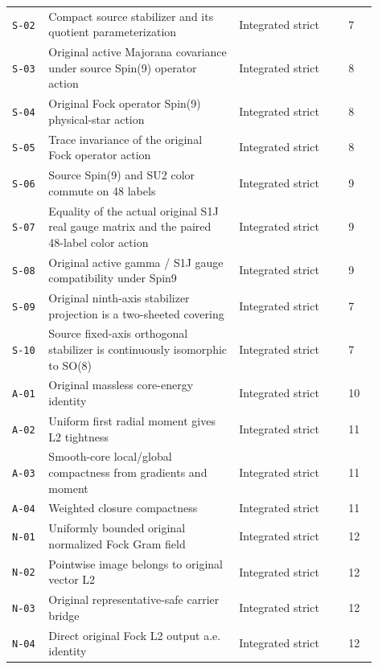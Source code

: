 \begin{longtable}{@{}p{0.09\linewidth}p{0.47\linewidth}p{0.27\linewidth}p{0.07\linewidth}@{}}
\texttt{S-02} & Compact source stabilizer and its quotient parameterization & Integrated strict & 7 \\
\addlinespace[0.15em]
\texttt{S-03} & Original active Majorana covariance under source Spin(9) operator action & Integrated strict & 8 \\
\addlinespace[0.15em]
\texttt{S-04} & Original Fock operator Spin(9) physical-star action & Integrated strict & 8 \\
\addlinespace[0.15em]
\texttt{S-05} & Trace invariance of the original Fock operator action & Integrated strict & 8 \\
\addlinespace[0.15em]
\texttt{S-06} & Source Spin(9) and SU2 color commute on 48 labels & Integrated strict & 9 \\
\addlinespace[0.15em]
\texttt{S-07} & Equality of the actual original S1J real gauge matrix and the paired 48-label color action & Integrated strict & 9 \\
\addlinespace[0.15em]
\texttt{S-08} & Original active gamma / S1J gauge compatibility under Spin9 & Integrated strict & 9 \\
\addlinespace[0.15em]
\texttt{S-09} & Original ninth-axis stabilizer projection is a two-sheeted covering & Integrated strict & 7 \\
\addlinespace[0.15em]
\texttt{S-10} & Source fixed-axis orthogonal stabilizer is continuously isomorphic to SO(8) & Integrated strict & 7 \\
\addlinespace[0.15em]
\texttt{A-01} & Original massless core-energy identity & Integrated strict & 10 \\
\addlinespace[0.15em]
\texttt{A-02} & Uniform first radial moment gives L2 tightness & Integrated strict & 11 \\
\addlinespace[0.15em]
\texttt{A-03} & Smooth-core local/global compactness from gradients and moment & Integrated strict & 11 \\
\addlinespace[0.15em]
\texttt{A-04} & Weighted closure compactness & Integrated strict & 11 \\
\addlinespace[0.15em]
\texttt{N-01} & Uniformly bounded original normalized Fock Gram field & Integrated strict & 12 \\
\addlinespace[0.15em]
\texttt{N-02} & Pointwise image belongs to original vector L2 & Integrated strict & 12 \\
\addlinespace[0.15em]
\texttt{N-03} & Original representative-safe carrier bridge & Integrated strict & 12 \\
\addlinespace[0.15em]
\texttt{N-04} & Direct original Fock L2 output a.e. identity & Integrated strict & 12 \\

\end{longtable}
